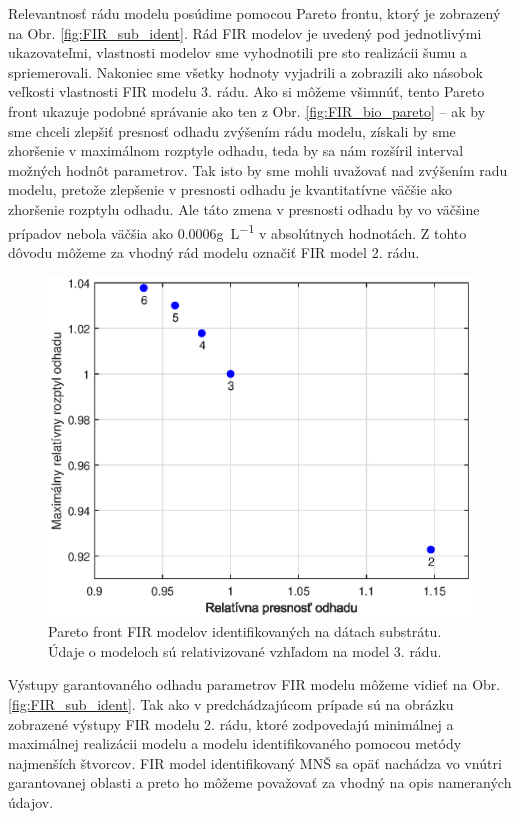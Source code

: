 Relevantnosť rádu modelu posúdime pomocou Pareto frontu, ktorý je zobrazený na Obr. \ref{fig:FIR_sub_ident}. Rád FIR modelov je uvedený pod jednotlivými ukazovateľmi, vlastnosti modelov sme vyhodnotili pre sto realizácii šumu a spriemerovali. Nakoniec sme všetky hodnoty vyjadrili a zobrazili ako násobok veľkosti vlastnosti FIR modelu 3. rádu. Ako si môžeme všimnúť, tento Pareto front ukazuje podobné správanie ako ten z Obr. \ref{fig:FIR_bio_pareto} -- ak by sme chceli zlepšiť presnosť odhadu zvýšením rádu modelu, získali by sme zhoršenie v maximálnom rozptyle odhadu, teda by sa nám rozšíril interval možných hodnôt parametrov. Tak isto by sme mohli uvažovať nad zvýšením radu modelu, pretože zlepšenie v presnosti odhadu je kvantitatívne väčšie ako zhoršenie rozptylu odhadu. Ale táto zmena v presnosti odhadu by vo väčšine prípadov nebola väčšia ako 0.0006\si{\gram\per\liter} v absolútnych hodnotách. Z tohto dôvodu môžeme za vhodný rád modelu označiť FIR model 2. rádu. 
\begin{figure}
	\centering
	\includegraphics[width=0.7\linewidth]{images/FIR_sub_pareto}
	\caption{Pareto front FIR modelov identifikovaných na dátach substrátu. Údaje o modeloch sú relativizované vzhľadom na model 3. rádu.}
	\label{fig:FIR_sub_pareto}
\end{figure}

Výstupy garantovaného odhadu parametrov FIR modelu môžeme vidieť na Obr. \ref{fig:FIR_sub_ident}. Tak ako v predchádzajúcom prípade sú na obrázku zobrazené výstupy FIR modelu 2. rádu, ktoré zodpovedajú minimálnej a maximálnej realizácii modelu a modelu identifikovaného pomocou metódy najmenších štvorcov. FIR model identifikovaný MNŠ sa opäť nachádza vo vnútri garantovanej oblasti a preto ho môžeme považovať za vhodný na opis nameraných údajov.

